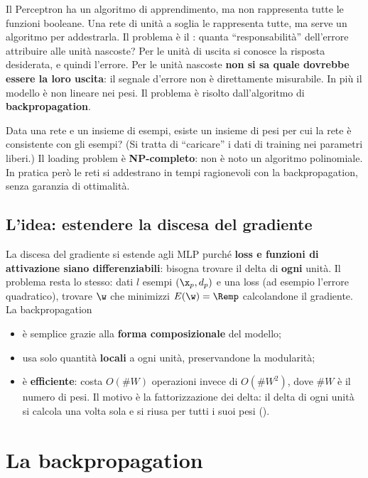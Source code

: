 Il Perceptron ha un algoritmo di apprendimento, ma non rappresenta tutte le funzioni booleane. Una rete di unità a
soglia le rappresenta tutte, ma serve un algoritmo per addestrarla. Il problema è il :
quanta ``responsabilità'' dell'errore attribuire alle unità nascoste? Per le unità di uscita si conosce la
risposta desiderata, e quindi l'errore. Per le unità nascoste \textbf{non si sa quale dovrebbe essere la loro
uscita}: il segnale d'errore non è direttamente misurabile. In più il modello è non lineare nei pesi. Il
problema è risolto dall'algoritmo di \textbf{backpropagation}.

\begin{definizione}
Data una rete e un insieme di esempi, esiste un insieme di pesi per cui la rete è consistente con gli esempi?
(Si tratta di ``caricare'' i dati di training nei parametri liberi.) Il loading problem è
\textbf{NP-completo}: non è noto un algoritmo polinomiale. In pratica però le reti si addestrano in tempi
ragionevoli con la backpropagation, senza garanzia di ottimalità.
\end{definizione}

\subsection{L'idea: estendere la discesa del gradiente}

La discesa del gradiente si estende agli MLP purché \textbf{loss e funzioni di attivazione siano differenziabili}:
bisogna trovare il delta di \textbf{ogni} unità. Il problema resta lo stesso: dati $l$ esempi $(\x_p,d_p)$ e una
loss (ad esempio l'errore quadratico), trovare $\w$ che minimizzi $E(\w) = \Remp$ calcolandone il gradiente. La
backpropagation
\begin{itemize}
  \item è semplice grazie alla \textbf{forma composizionale} del modello;
  \item usa solo quantità \textbf{locali} a ogni unità, preservandone la modularità;
  \item è \textbf{efficiente}: costa $O(\#W)$ operazioni invece di $O(\#W^2)$, dove $\#W$ è il numero di pesi. Il
        motivo è la fattorizzazione dei delta: il delta di ogni unità si calcola una volta sola e si riusa per
        tutti i suoi pesi ().
\end{itemize}

\section{La backpropagation}
\label{sec:backprop}

